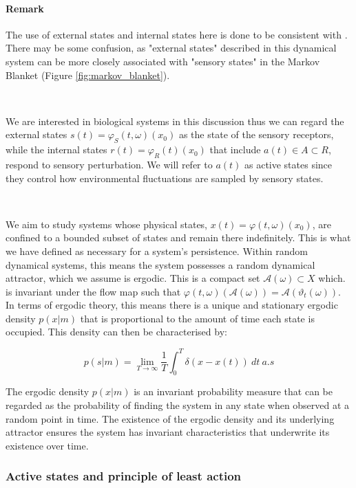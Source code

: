 \documentclass{article}
\begin{document}
\paragraph{Remark} The use of external states and internal states here is done to be consistent with \citet{friston2012active}. There may be some confusion, as "external states" described in this dynamical system can be more closely associated with "sensory states" in the Markov Blanket (Figure \ref{fig:markov_blanket}).

\

We are interested in biological systems in this discussion thus we can regard the external states $s(t) = \varphi_S(t, \omega)(x_0)$ as the state of the sensory receptors, while the internal states $r(t) = \varphi_R(t)(x_0)$ that include $a(t) \in A \subset R$, respond to sensory perturbation. We will refer to $a(t)$ as active states since they control how environmental fluctuations are sampled by sensory states.

\

We aim to study systems whose physical states, $x(t) = \varphi(t, \omega)(x_0)$, are confined to a bounded subset of states and remain there indefinitely. This is what we have defined as necessary for a system's persistence. Within random dynamical systems, this means the system possesses a random dynamical attractor, which we assume is ergodic. This is a compact set $\mathcal{A}(\omega) \subset X$ which. is invariant under the flow map such that  $\varphi(t, \omega)(\mathcal{A}(\omega)) = \mathcal{A}(\vartheta_t(\omega))$. In terms of ergodic theory, this means there is a unique and stationary ergodic density $p(x | m)$ that is proportional to the amount of time each state is occupied. This density can then be characterised by:

\begin{equation}\label{eq:ergodic_density}
	p(s | m ) = \lim_{T \to \infty} \frac{1}{T} \int^T_0 \delta( x - x(t)) \ dt \ a.s
\end{equation}

The ergodic density $p(x | m)$ is an invariant probability measure that can be regarded as the  probability of finding the system in any state when observed at a random point in time. The existence of the ergodic density and its underlying attractor ensures the system has invariant characteristics that  underwrite its existence over time. 

\subsubsection{Active states and principle of least action}
\end{document}
